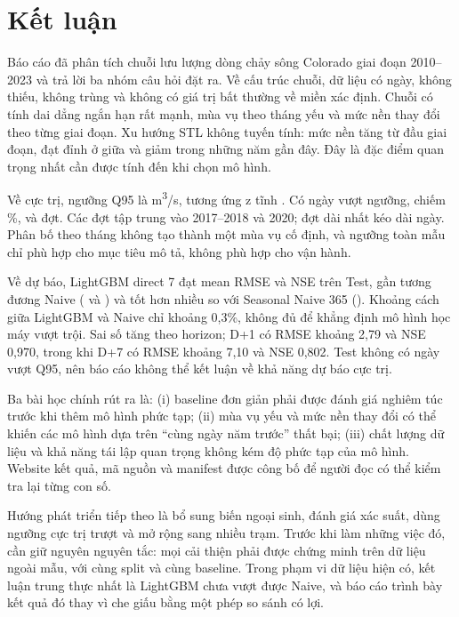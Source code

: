 \section{Kết luận}
\label{sec:conclusion}

Báo cáo đã phân tích chuỗi lưu lượng dòng chảy sông Colorado giai đoạn 2010--2023
và trả lời ba nhóm câu hỏi đặt ra. Về cấu trúc chuỗi, dữ liệu có \DatasetN{} ngày,
không thiếu, không trùng và không có giá trị bất thường về miền xác định. Chuỗi có
tính dai dẳng ngắn hạn rất mạnh, mùa vụ theo tháng yếu và mức nền thay đổi theo
từng giai đoạn. Xu hướng STL không tuyến tính: mức nền tăng từ đầu giai đoạn, đạt
đỉnh ở giữa và giảm trong những năm gần đây. Đây là đặc điểm quan trọng nhất cần
được tính đến khi chọn mô hình.

Về cực trị, ngưỡng Q95 là \QHigh{} m\textsuperscript{3}/s, tương ứng z tĩnh
\ZThreshold{}. Có \NDaysHigh{} ngày vượt ngưỡng, chiếm \ShareHigh{}\%, và
\NEvents{} đợt. Các đợt tập trung vào 2017--2018 và 2020; đợt dài nhất kéo dài
\LongestEvent{} ngày. Phân bố theo tháng không tạo thành một mùa vụ cố định, và
ngưỡng toàn mẫu chỉ phù hợp cho mục tiêu mô tả, không phù hợp cho vận hành.

Về dự báo, LightGBM direct 7 đạt mean RMSE \LgbmMeanRmse{} và NSE \LgbmMeanNse{}
trên Test, gần tương đương Naive (\NaiveMeanRmse{} và \NaiveMeanNse{}) và tốt hơn
nhiều so với Seasonal Naive 365 (\SeasonalMeanRmse{}). Khoảng cách giữa LightGBM và
Naive chỉ khoảng 0,3\%, không đủ để khẳng định mô hình học máy vượt trội. Sai số
tăng theo horizon; D+1 có RMSE khoảng 2,79 và NSE 0,970, trong khi D+7 có RMSE
khoảng 7,10 và NSE 0,802. Test không có ngày vượt Q95, nên báo cáo không thể kết
luận về khả năng dự báo cực trị.

Ba bài học chính rút ra là: (i) baseline đơn giản phải được đánh giá nghiêm túc
trước khi thêm mô hình phức tạp; (ii) mùa vụ yếu và mức nền thay đổi có thể khiến
các mô hình dựa trên “cùng ngày năm trước” thất bại; (iii) chất lượng dữ liệu và
khả năng tái lập quan trọng không kém độ phức tạp của mô hình. Website kết quả,
mã nguồn và manifest được công bố để người đọc có thể kiểm tra lại từng con số.

Hướng phát triển tiếp theo là bổ sung biến ngoại sinh, đánh giá xác suất, dùng
ngưỡng cực trị trượt và mở rộng sang nhiều trạm. Trước khi làm những việc đó, cần
giữ nguyên nguyên tắc: mọi cải thiện phải được chứng minh trên dữ liệu ngoài mẫu,
với cùng split và cùng baseline. Trong phạm vi dữ liệu hiện có, kết luận trung thực
nhất là LightGBM chưa vượt được Naive, và báo cáo trình bày kết quả đó thay vì che
giấu bằng một phép so sánh có lợi.
